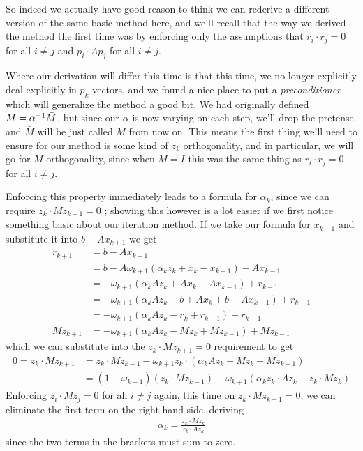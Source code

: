\documentclass[11pt]{article}
\begin{document}
So indeed we actually have good reason to think we can rederive a different version of the same basic method here, and we'll recall that the way we derived the method the first time was by enforcing only the assumptions that $r_i \cdot r_j = 0$ for all $i \neq j$ and $p_i \cdot A p_j$ for all $i \neq j$.

Where our derivation will differ this time is that this time, we no longer explicitly deal explicitly in $p_k$ vectors, and we found a nice place to put a \emph{preconditioner} which will generalize the method a good bit. We had originally defined $M = \alpha^{-1} \bar M$, but since our $\alpha$ is now varying on each step, we'll drop the pretense and $\bar M$ will be just called $M$ from now on. This means the first thing we'll need to ensure for our method is some kind of $z_k$ orthogonality, and in particular, we will go for $M$-orthogonality, since when $M = I$ this was the same thing as $r_i \cdot r_j = 0$ for all $i \neq j$.

Enforcing this property immediately leads to a formula for $\alpha_k$, since we can require $z_k \cdot M z_{k+1} = 0$ ; showing this however is a lot easier if we first notice something basic about our iteration method. If we take our formula for $x_{k+1}$ and substitute it into $b - Ax_{k+1}$ we get \begin{align*}
r_{k+1} &= b - Ax_{k+1} \\
&= b - A\omega_{k+1} (\alpha_k z_k + x_k - x_{k-1}) - Ax_{k-1} \\
&= - \omega_{k+1}(\alpha_k A z_k + Ax_k - Ax_{k-1}) + r_{k-1} \\
&=  - \omega_{k+1}(\alpha_k A z_k - b + Ax_k + b - Ax_{k-1}) + r_{k-1} \\
&= - \omega_{k+1}(\alpha_k A z_k - r_k + r_{k-1}) + r_{k-1} \\
Mz_{k+1} &= - \omega_{k+1}(\alpha_k A z_k - Mz_k + Mz_{k-1}) + Mz_{k-1}
\end{align*}
which we can substitute into the $z_k \cdot M z_{k+1} = 0$ requirement to get \begin{align*}
0 = z_k \cdot M z_{k+1} &= z_k \cdot Mz_{k-1} - \omega_{k+1} z_k \cdot (\alpha_k A z_k - Mz_k + Mz_{k-1}) \\
&= (1 - \omega_{k+1})(z_k \cdot Mz_{k-1}) - \omega_{k+1} (\alpha_k z_k \cdot A z_k - z_k \cdot Mz_k)
\end{align*}
Enforcing $z_{i} \cdot M z_j = 0$ for all $i \neq j$ again, this time on $z_k \cdot M z_{k-1} = 0$, we can eliminate the first term on the right hand side, deriving \begin{gather*}
\alpha_k = \frac{z_k \cdot M z_k }{z_k \cdot A z_k}
\end{gather*}
since the two terms in the brackets must sum to zero.
\end{document}
